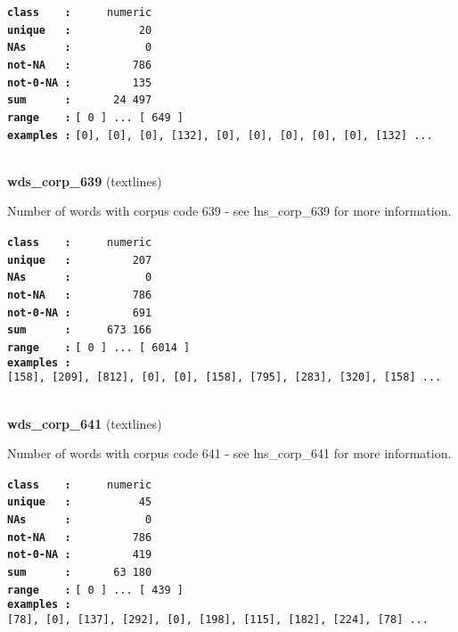 \documentclass[]{article}
\begin{document}
\textbf{\texttt{class\ \ \ \ :}} \texttt{~~~~~numeric}\\
\textbf{\texttt{unique\ \ \ :}} \texttt{~~~~~~~~~~20}\\
\textbf{\texttt{NAs\ \ \ \ \ \ :}} \texttt{~~~~~~~~~~~0}\\
\textbf{\texttt{not-NA\ \ \ :}} \texttt{~~~~~~~~~786}\\
\textbf{\texttt{not-0-NA\ :}} \texttt{~~~~~~~~~135}\\
\textbf{\texttt{sum\ \ \ \ \ \ :}} \texttt{~~~~~~24~497}\\
\textbf{\texttt{range\ \ \ \ :}}
\texttt{{[}\ 0\ {]}\ ...\ {[}\ 649\ {]}}\\
\textbf{\texttt{examples\ :}}
\texttt{{[}0{]},\ {[}0{]},\ {[}0{]},\ {[}132{]},\ {[}0{]},\ {[}0{]},\ {[}0{]},\ {[}0{]},\ {[}0{]},\ {[}132{]}\ ...}\\

~

\textbf{wds\_corp\_639} (textlines)

Number of words with corpus code 639 - see lns\_corp\_639 for more
information.

\textbf{\texttt{class\ \ \ \ :}} \texttt{~~~~~numeric}\\
\textbf{\texttt{unique\ \ \ :}} \texttt{~~~~~~~~~207}\\
\textbf{\texttt{NAs\ \ \ \ \ \ :}} \texttt{~~~~~~~~~~~0}\\
\textbf{\texttt{not-NA\ \ \ :}} \texttt{~~~~~~~~~786}\\
\textbf{\texttt{not-0-NA\ :}} \texttt{~~~~~~~~~691}\\
\textbf{\texttt{sum\ \ \ \ \ \ :}} \texttt{~~~~~673~166}\\
\textbf{\texttt{range\ \ \ \ :}}
\texttt{{[}\ 0\ {]}\ ...\ {[}\ 6014\ {]}}\\
\textbf{\texttt{examples\ :}}
\texttt{{[}158{]},\ {[}209{]},\ {[}812{]},\ {[}0{]},\ {[}0{]},\ {[}158{]},\ {[}795{]},\ {[}283{]},\ {[}320{]},\ {[}158{]}\ ...}\\

~

\textbf{wds\_corp\_641} (textlines)

Number of words with corpus code 641 - see lns\_corp\_641 for more
information.

\textbf{\texttt{class\ \ \ \ :}} \texttt{~~~~~numeric}\\
\textbf{\texttt{unique\ \ \ :}} \texttt{~~~~~~~~~~45}\\
\textbf{\texttt{NAs\ \ \ \ \ \ :}} \texttt{~~~~~~~~~~~0}\\
\textbf{\texttt{not-NA\ \ \ :}} \texttt{~~~~~~~~~786}\\
\textbf{\texttt{not-0-NA\ :}} \texttt{~~~~~~~~~419}\\
\textbf{\texttt{sum\ \ \ \ \ \ :}} \texttt{~~~~~~63~180}\\
\textbf{\texttt{range\ \ \ \ :}}
\texttt{{[}\ 0\ {]}\ ...\ {[}\ 439\ {]}}\\
\textbf{\texttt{examples\ :}}
\texttt{{[}78{]},\ {[}0{]},\ {[}137{]},\ {[}292{]},\ {[}0{]},\ {[}198{]},\ {[}115{]},\ {[}182{]},\ {[}224{]},\ {[}78{]}\ ...}\\
\end{document}
